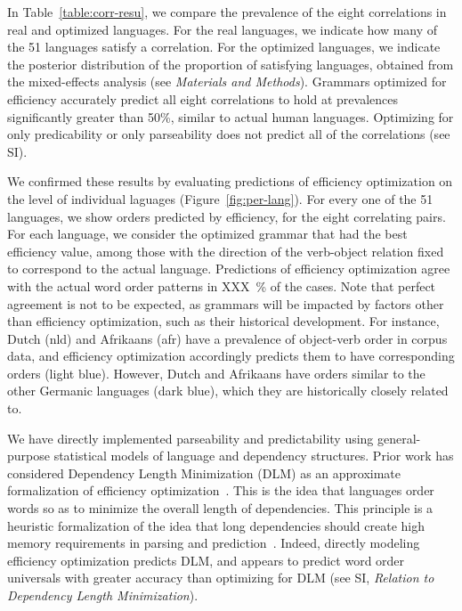 \documentclass[9pt,twocolumn,twoside,lineno]{pnas-new}
\begin{document}
In Table~\ref{table:corr-resu}, we compare the prevalence of the eight correlations in real and optimized languages.
For the real languages, we indicate how many of the 51 languages satisfy a correlation.
For the optimized languages, we indicate the posterior distribution of the proportion of satisfying languages, obtained from the mixed-effects analysis (see \textit{Materials and Methods}).
Grammars optimized for efficiency accurately predict all eight correlations to hold at prevalences significantly greater than 50\%, similar to actual human languages.
Optimizing for only predicability or only parseability does not predict all of the correlations (see SI).




We confirmed these results by evaluating predictions of efficiency optimization on the level of individual laguages (Figure~\ref{fig:per-lang}).
For every one of the 51 languages, we show orders predicted by efficiency, for the eight correlating pairs.
For each language, we consider the optimized grammar that had the best efficiency value, among those with the direction of the verb-object relation fixed to correspond to the actual language.
Predictions of efficiency optimization agree with the actual word order patterns in XXX~\% of the cases.
Note that perfect agreement is not to be expected, as grammars will be impacted by factors other than efficiency optimization, such as their historical development.
For instance, Dutch (nld) and Afrikaans (afr) have a prevalence of object-verb order in corpus data, and efficiency optimization accordingly predicts them to have corresponding orders (light blue).
However, Dutch and Afrikaans have orders similar to the other Germanic languages (dark blue), which they are historically closely related to.






We have directly implemented parseability and predictability using general-purpose statistical models of language and dependency structures.
Prior work has considered Dependency Length Minimization (DLM) as an approximate formalization of efficiency optimization~\cite{futrell2015largescale,liu2017dependency,temperley2018minimizing}.
This is the idea that languages order words so as to minimize the overall length of dependencies.
This principle is a heuristic formalization of the idea that long dependencies should create high memory requirements in parsing and prediction~\cite{hawkins1994performance,gibson1998linguistic,gibson2000dependency, futrell2017memory}.
Indeed, directly modeling efficiency optimization predicts DLM, and appears to predict word order universals with greater accuracy than optimizing for DLM (see SI, \emph{Relation to Dependency Length Minimization}).
\end{document}
